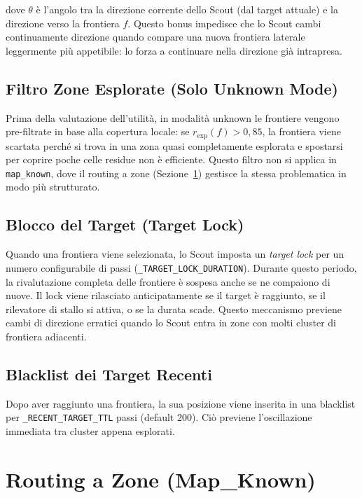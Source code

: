 dove $\theta$ \`e l'angolo tra la direzione corrente dello Scout (dal target attuale)
e la direzione verso la frontiera $f$. Questo bonus impedisce che lo Scout cambi
continuamente direzione quando compare una nuova frontiera laterale leggermente pi\`u
appetibile: lo forza a continuare nella direzione gi\`a intrapresa.

\subsection{Filtro Zone Esplorate (Solo Unknown Mode)}

Prima della valutazione dell'utilit\`a, in modalit\`a unknown le frontiere vengono
pre-filtrate in base alla copertura locale: se $r_{\text{exp}}(f) > 0{,}85$,
la frontiera viene scartata perch\'e si trova in una zona quasi completamente
esplorata e spostarsi per coprire poche celle residue non \`e efficiente.
Questo filtro non si applica in \texttt{map\_known}, dove il routing a zone
(Sezione~\ref{sec:zone-routing}) gestisce la stessa problematica in modo pi\`u
strutturato.

\subsection{Blocco del Target (Target Lock)}

Quando una frontiera viene selezionata, lo Scout imposta un \textit{target lock}
per un numero configurabile di passi (\texttt{\_TARGET\_LOCK\_DURATION}). Durante
questo periodo, la rivalutazione completa delle frontiere \`e sospesa anche se ne
compaiono di nuove. Il lock viene rilasciato anticipatamente se il target \`e
raggiunto, se il rilevatore di stallo si attiva, o se la durata scade. Questo
meccanismo previene cambi di direzione erratici quando lo Scout entra in zone con
molti cluster di frontiera adiacenti.

\subsection{Blacklist dei Target Recenti}

Dopo aver raggiunto una frontiera, la sua posizione viene inserita in una blacklist
per \linebreak[2]\texttt{\_RECENT\_TARGET\_TTL} passi (default 200). Ci\`o previene l'oscillazione
immediata tra cluster appena esplorati.

\section{Routing a Zone (Map\_Known)} \label{sec:zone-routing}

